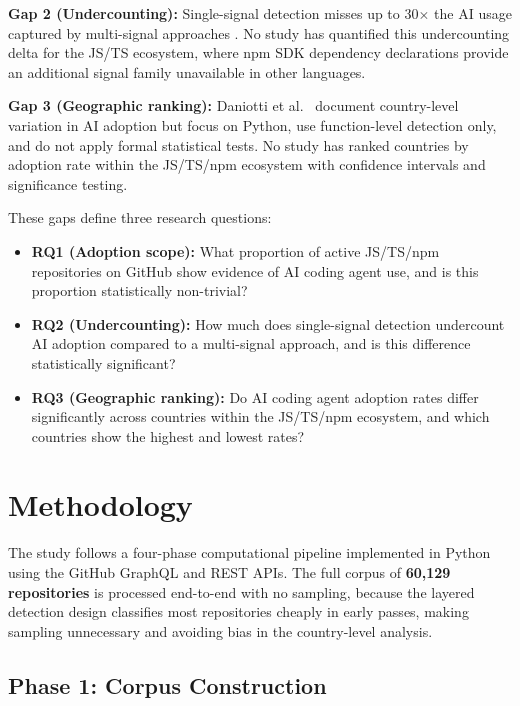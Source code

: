 \documentclass[11pt,a4paper]{article}
\begin{document}
\textbf{Gap 2 (Undercounting):} Single-signal detection misses up to 30$\times$ the
AI usage captured by multi-signal approaches \cite{khosravani2026detecting}. No study
has quantified this undercounting delta for the JS/TS ecosystem, where npm SDK dependency
declarations provide an additional signal family unavailable in other languages.

\textbf{Gap 3 (Geographic ranking):} Daniotti et al.~\cite{daniotti2025} document
country-level variation in AI adoption but focus on Python, use function-level detection
only, and do not apply formal statistical tests. No study has ranked countries by adoption
rate within the JS/TS/npm ecosystem with confidence intervals and significance testing.

\medskip
\noindent These gaps define three research questions:

\begin{itemize}
    \item \textbf{RQ1 (Adoption scope):} What proportion of active JS/TS/npm repositories
          on GitHub show evidence of AI coding agent use, and is this proportion
          statistically non-trivial?
    \item \textbf{RQ2 (Undercounting):} How much does single-signal detection undercount
          AI adoption compared to a multi-signal approach, and is this difference
          statistically significant?
    \item \textbf{RQ3 (Geographic ranking):} Do AI coding agent adoption rates differ
          significantly across countries within the JS/TS/npm ecosystem, and which
          countries show the highest and lowest rates?
\end{itemize}

\section{Methodology}

The study follows a four-phase computational pipeline implemented in Python using the
GitHub GraphQL and REST APIs. The full corpus of \textbf{60,129 repositories} is processed
end-to-end with no sampling, because the layered detection design classifies most repositories
cheaply in early passes, making sampling unnecessary and avoiding bias in the country-level analysis.

\subsection{Phase 1: Corpus Construction}
\end{document}
